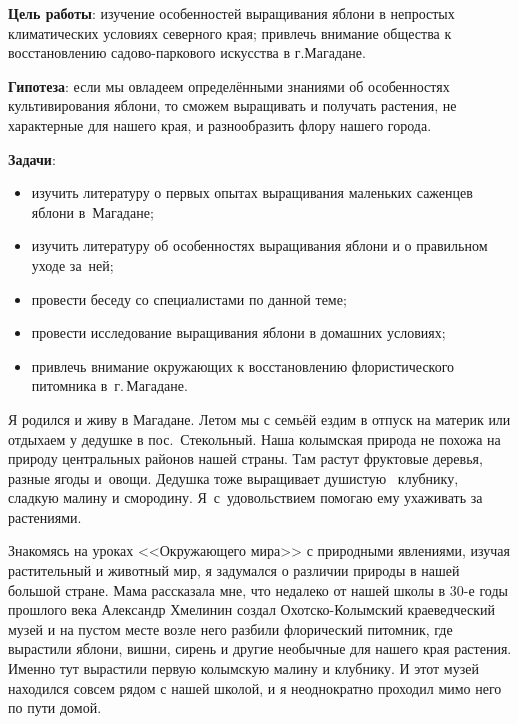 \bigskip
{}



\makeProcTitleSchool


\textbf{Цель работы}: изучение особенностей выращивания яблони в непростых климатических условиях северного края; привлечь внимание общества к восстановлению садово-паркового искусства в г.Магадане.

\textbf{Гипотеза}: если мы овладеем определёнными знаниями об особенностях культивирования яблони, то сможем выращивать и получать растения, не характерные для нашего края, и разнообразить флору нашего города.

\textbf{Задачи}:

\begin{itemize}[noitemsep]\vspace{-8pt}
\item изучить литературу о первых опытах выращивания маленьких саженцев яблони в~Магадане;
\item изучить литературу об особенностях выращивания яблони и о правильном уходе за~ней;
\item провести беседу со специалистами по данной теме;
\item провести исследование  выращивания яблони в домашних условиях;
\item привлечь внимание окружающих к восстановлению флористического питомника в~г.\,Ма\-га\-да\-не.
\end{itemize}\vspace{-8pt}

Я родился и живу в Магадане. Летом мы с семьёй ездим в отпуск на материк или отдыхаем у дедушке в пос.~Стекольный. Наша колымская природа не похожа на природу центральных районов нашей страны. Там растут фруктовые деревья, разные ягоды и~овощи. Дедушка тоже выращивает душистую  клубнику, сладкую малину и смородину. Я~с~удовольствием помогаю ему ухаживать за растениями.

Знакомясь на уроках <<Окружающего мира>> с природными явлениями, изучая растительный и животный мир, я задумался о различии природы в нашей большой стране. Мама рассказала мне, что недалеко от нашей школы в 30-е годы прошлого века Александр Хмелинин создал Охотско-Колымский краеведческий музей и на пустом месте возле него разбили флорический питомник, где вырастили яблони, вишни, сирень и другие необычные для нашего края растения. Именно тут вырастили первую колымскую малину и клубнику. И этот музей находился совсем рядом с нашей школой, и я неоднократно проходил мимо него по пути домой.

